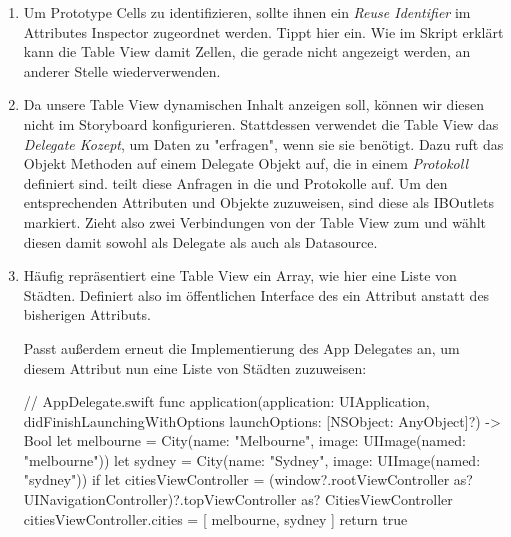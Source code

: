 \documentclass[parskip=half, final]{scrreprt}
\begin{document}
\begin{lecture}
\begin{enumerate}

\item Um Prototype Cells zu identifizieren, sollte ihnen ein \emph{Reuse Identifier} im Attributes Inspector zugeordnet werden. Tippt hier  ein. Wie im Skript erklärt kann die Table View damit Zellen, die gerade nicht angezeigt werden, an anderer Stelle wiederverwenden.

\item Da unsere Table View dynamischen Inhalt anzeigen soll, können wir diesen nicht im Storyboard konfigurieren. Stattdessen verwendet die Table View das \emph{Delegate Kozept}, um Daten zu "{}erfragen"{}, wenn sie sie benötigt. Dazu ruft das  Objekt Methoden auf einem Delegate Objekt auf, die in einem \emph{Protokoll} definiert sind.  teilt diese Anfragen in die  und  Protokolle auf. Um den entsprechenden Attributen  und  Objekte zuzuweisen, sind diese als IBOutlets markiert. Zieht also zwei Verbindungen von der Table View zum  und wählt diesen damit sowohl als Delegate als auch als Datasource.

\item Häufig repräsentiert eine Table View ein Array, wie hier eine Liste von Städten. Definiert also im öffentlichen Interface des  ein Attribut  anstatt des bisherigen  Attributs.

Passt außerdem erneut die Implementierung des App Delegates an, um diesem Attribut nun eine Liste von Städten zuzuweisen:

\begin{swiftcode}
// AppDelegate.swift
func application(application: UIApplication, didFinishLaunchingWithOptions launchOptions: [NSObject: AnyObject]?) -> Bool {
    let melbourne = City(name: "Melbourne", image: UIImage(named: "melbourne"))
    let sydney = City(name: "Sydney", image: UIImage(named: "sydney"))
    if let citiesViewController = (window?.rootViewController as? UINavigationController)?.topViewController as? CitiesViewController {
        citiesViewController.cities = [ melbourne, sydney ]
    }
    return true
}
\end{swiftcode}


\end{enumerate}
\end{lecture}
\end{document}
